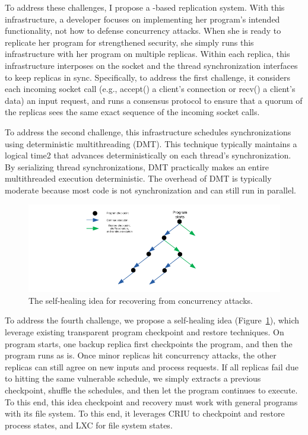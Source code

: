 To address these challenges, I propose a \smr-based replication 
system. With this infrastructure, a developer focuses on implementing her 
program’s intended functionality, not how to defense concurrency attacks. When 
she is ready to replicate her program for strengthened security, she simply
runs this infrastructure with her program on multiple replicas. Within
each replica, this infrastructure interposes on the socket and the thread
synchronization interfaces to keep replicas in sync. Specifically, to address 
the first challenge, it considers each incoming socket call (e.g., accept() a 
client’s connection or recv() a client’s data) an input request, and runs a 
\paxos consensus protocol to ensure that a quorum of the replicas sees the same 
exact sequence of the incoming socket calls.

To address the second challenge, this infrastructure schedules synchronizations 
using deterministic multithreading (DMT). This technique
typically maintains a logical time2 that advances deterministically on each 
thread's synchronization. By serializing thread synchronizations, DMT 
practically makes an entire multithreaded execution deterministic. The overhead
of DMT is typically moderate because most code is not synchronization and can 
still run in parallel.

\begin{figure}[t]
\centering
\includegraphics[width=0.3\columnwidth]{figures/healing}
\vspace{-.05in}
\caption{{The self-healing idea for recovering from concurrency attacks.}} 
\label{fig:healing}
\vspace{-.05in}
\end{figure}

To address the fourth challenge, we propose a self-healing idea 
(Figure~\ref{fig:healing}), which leverage existing transparent program 
checkpoint and restore techniques. On program starts, one backup replica first 
checkpoints the program, and then the program runs as is. Once minor replicas 
hit concurrency attacks, the other replicas can still agree on new inputs and 
process requests. If all replicas fail due to hitting the same vulnerable 
schedule, we simply extracts a previous checkpoint, shuffle the schedules, and 
then let the program continues to execute. To this end, this idea checkpoint 
and recovery must work with general programs with its file system. To this end, 
it leverages CRIU to checkpoint and restore process states, and LXC for file 
system states.

